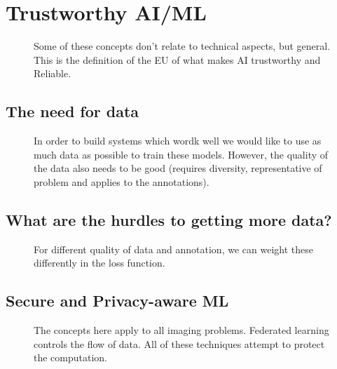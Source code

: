 \documentclass[11pt]{article}
\begin{document}


\tableofcontents

\clearpage

\section{Trustworthy AI/ML}

\begin{figure}[H]
    \centering
    \caption{Some of these concepts don't relate to technical aspects, but general. This is the definition of the EU of what makes AI trustworthy and Reliable.}
\end{figure}

\subsection{The need for data}

\begin{figure}[H]
    \centering
    \caption{In order to build systems which wordk well we would like to use as much data as possible to train these models. However, the quality of the data also needs to be good (requires diversity, representative of problem and applies to the annotations).} 
\end{figure}

\subsection{What are the hurdles to getting more data?}

\begin{figure}[H]
    \centering
    \caption{For different quality of data and annotation, we can weight these differently in the loss function.}
\end{figure}

\subsection{Secure and Privacy-aware ML}

\begin{figure}[H]
    \centering
    \caption{The concepts here apply to all imaging problems. Federated learning controls the flow of data. All of these techniques attempt to protect the computation.}
\end{figure}
\end{document}
